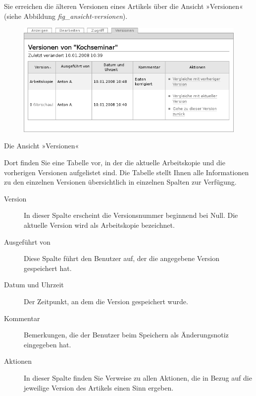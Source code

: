 \documentclass[a4paper,12pt,ngerman]{manual}
\begin{document}
Sie erreichen die älteren Versionen eines Artikels über die Ansicht
»Versionen« (siehe Abbildung \emph{fig\_ansicht-versionen}).
\hypertarget{fig-ansicht-versionen}{}\begin{figure}[htbp]
\centering

\includegraphics{ansicht-versionen.png}
\end{figure}

Die Ansicht »Versionen«

Dort finden Sie eine Tabelle vor, in der die aktuelle Arbeitskopie und die
vorherigen Versionen aufgelistet sind. Die Tabelle stellt Ihnen alle
Informationen zu den einzelnen Versionen übersichtlich in einzelnen Spalten
zur Verfügung.
\begin{description}
\item[Version] \leavevmode
In dieser Spalte erscheint die Versionsnummer beginnend bei
Null. Die aktuelle Version wird als Arbeitskopie bezeichnet.

\item[Ausgeführt von] \leavevmode
Diese Spalte führt den Benutzer auf, der die angegebene
Version gespeichert hat.

\item[Datum und Uhrzeit] \leavevmode
Der Zeitpunkt, an dem die Version gespeichert wurde.

\item[Kommentar] \leavevmode
Bemerkungen, die der Benutzer beim Speichern als
Änderungsnotiz eingegeben hat.

\item[Aktionen] \leavevmode
In dieser Spalte finden Sie Verweise zu allen Aktionen, die in
Bezug auf die jeweilige Version des Artikels einen Sinn ergeben.

\end{description}
\end{document}
